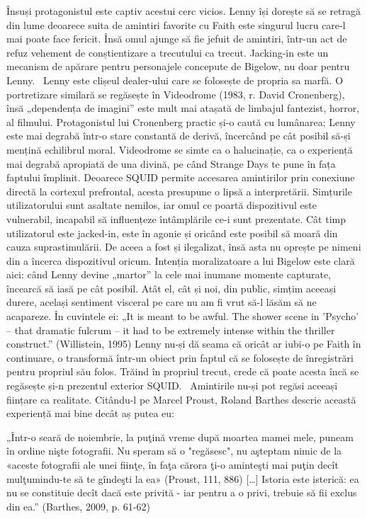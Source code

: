 \documentclass[12pt]{article}
\begin{document}
Însuși protagonistul este captiv acestui cerc vicios. Lenny își dorește să se retragă din lume deoarece suita de amintiri favorite cu Faith este singurul lucru care-l mai poate face fericit. Însă omul ajunge să fie jefuit de amintiri, într-un act de refuz vehement de conștientizare a trecutului ca trecut. Jacking-in este un mecanism de apărare pentru personajele concepute de Bigelow, nu doar pentru Lenny. 
Lenny este clișeul dealer-ului care se folosește de propria sa marfă. O portretizare similară se regăsește în Videodrome (1983, r. David Cronenberg), însă „dependența de imagini” este mult mai atașată de limbajul fantezist, horror, al filmului. Protagonistul lui Cronenberg practic și-o caută cu lumânarea; Lenny este mai degrabă într-o stare constantă de derivă, încercând pe cât posibil să-și mențină echilibrul moral. Videodrome se simte ca o halucinație, ca o experiență mai degrabă apropiată de una divină, pe când Strange Days te pune în fața faptului împlinit.
Deoarece SQUID permite accesarea amintirilor prin conexiune directă la cortexul prefrontal, acesta presupune o lipsă a interpretării. Simțurile utilizatorului sunt asaltate nemilos, iar omul ce poartă dispozitivul este vulnerabil, incapabil să influențeze întâmplările ce-i sunt prezentate. Cât timp utilizatorul este jacked-in, este în agonie și oricând este posibil să moară din cauza suprastimulării. De aceea a fost și ilegalizat, însă asta nu oprește pe nimeni din a încerca dispozitivul oricum. Intenția moralizatoare a lui Bigelow este clară aici: când Lenny devine „martor” la cele mai inumane momente capturate, încearcă să iasă pe cât posibil. Atât el, cât și noi, din public, simțim aceeași durere, același sentiment visceral pe care nu am fi vrut să-l lăsăm să ne acapareze. În cuvintele ei: „It is meant to be awful. The shower scene in 'Psycho' -- that dramatic fulcrum -- it had to be extremely intense within the thriller construct.” (Willistein, 1995)
Lenny nu-și dă seama că oricât ar iubi-o pe Faith în continuare, o transformă într-un obiect prin faptul că se folosește de înregistrări pentru propriul său folos. Trăind în propriul trecut, crede că poate acesta încă se regăsește și-n prezentul exterior SQUID. 
Amintirile nu-și pot regăsi aceeași ființare ca realitate. Citându-l pe Marcel Proust, Roland Barthes descrie această experiență mai bine decât aș putea eu:


\begin{displayquote}
	„Într-o seară de noiembrie, la puţină vreme după moartea mamei mele, puneam în ordine nişte fotografii. Nu speram să o "regăsesc", nu aşteptam nimic de la «aceste fotografii ale unei fiinţe, în faţa cărora ţi-o aminteşti mai puţin decît mulţumindu-te să te gîndeşti la ea» (Proust, 111, 886) […] Istoria este isteri­că: ea nu se constituie decît dacă este privită - iar pentru a o privi, trebuie să fii exclus din ea.” (Barthes, 2009, p. 61-62)
\end{displayquote}
\end{document}
